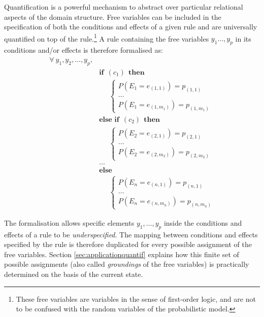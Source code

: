 Quantification is a powerful mechanism to abstract over particular relational aspects of the domain structure.  Free variables can be included in the specification of both the conditions and effects of a given rule and are universally quantified on top of the rule.\footnote{These free variables are variables in the sense of first-order logic, and are not to be confused with the random variables of the probabilistic model.}  A rule containing the free variables $y_1 \dots, y_p$ in its conditions and/or effects is therefore formalised as:
\begin{equation}
\begin{aligned}
\forall \ y_1, y_2, \dots, y_p, \\
& \textbf{if} \ \ (c_{1}) \ \ \textbf{then} \\ 
& \;\;\;\;\; \begin{cases}
P(E_1\!=\!e_{(1,1)}) = p_{(1,1)} \\
 \dots \\
P(E_1\!=\!e_{(1,m_1)}) = p_{(1,m_1)} 
\end{cases} \\[3mm]
& \textbf{else if} \ \ (c_{2}) \ \ \textbf{then} \\ 
& \;\;\;\;\; \begin{cases}
P(E_2\!=\!e_{(2,1)}) = p_{(2,1)} \\
 \dots \\
P(E_2\!=\!e_{(2,m_2)}) = p_{(2,m_2)} 
\end{cases} \\ 
&  \dots  \\
& \textbf{else} \\
& \;\;\;\;\; \begin{cases}
P(E_n\!=\!e_{(n,1)}) = p_{(n,1)} \\
 \dots \\
P(E_n\!=\!e_{(n,m_n)}) = p_{(n,m_n)}
\end{cases}
\end{aligned}
\label{eq:rulewithquant}
\end{equation}

The formalisation allows specific elements $y_1, \dots, y_p$ inside the conditions and effects of a rule to be \textit{underspecified}.  The mapping between conditions and effects specified by the rule is therefore duplicated for every possible assignment of the free variables.  Section \ref{sec:applicationquantif} explains how this finite set of possible assignments (also called \textit{groundings} of the free variables) is practically determined on the basis of the current state. 

